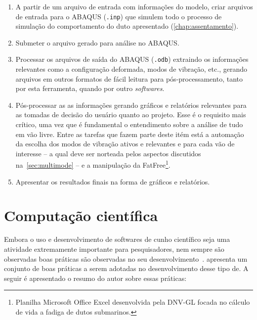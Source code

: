 \begin{enumerate}
    \item A partir de um arquivo de entrada com informações do modelo, criar arquivos de entrada para o ABAQUS (\texttt{.inp}) que simulem todo o processo de simulação do comportamento do duto apresentado (\autoref{chap:assentamento}).
    \item Submeter o arquivo gerado para análise no ABAQUS.\@
    \item Processar os arquivos de saída do ABAQUS (\texttt{.odb}) extraindo os informações relevantes como a configuração deformada, modos de vibração, etc., gerando arquivos em outros formatos de fácil leitura para pós-processamento, tanto por esta ferramenta, quando por outro \textit{softwares}.
    \item Pós-processar as as informações gerando gráficos e relatórios relevantes para as tomadas de decisão do usuário quanto ao projeto. Esse é o requisito mais crítico, uma vez que é fundamental o entendimento sobre a análise de tudo em vão livre. Entre as tarefas que fazem parte deste itém está a automação da escolha dos modos de vibração ativos e relevantes e para cada vão de interesse -- a qual deve ser norteada pelos aspectos discutidos na~\autoref{sec:multimode} -- e a manipulação da FatFree\footnote{Planilha Microsoft Office Excel desenvolvida pela DNV-GL focada no cálculo de vida a fadiga de dutos submarinos.}.
    \item Apresentar os resultados finais na forma de gráficos e relatórios.
\end{enumerate}

\section{Computação científica}

Embora o uso e desenvolvimento de softwares de cunho científico seja uma atividade extremamente importante para pesquisadores, nem sempre são observadas boas práticas são observadas no seu desenvolvimento~\cite{Hannay2009}.
 apresenta um conjunto de boas práticas a serem adotadas no desenvolvimento desse tipo de. A seguir é apresentado o resumo do autor sobre essas práticas:

